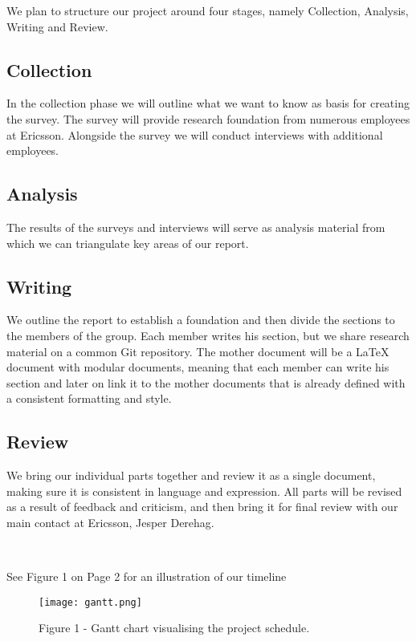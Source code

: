 \documentclass[ProjectPlan_innit.tex]{subfiles}
\begin{document}
We plan to structure our project around four stages, namely Collection, Analysis, Writing and Review. 

\subsection{Collection}
In the collection phase we will outline what we want to know as basis for creating the survey. The survey will provide research foundation from numerous employees at Ericsson. Alongside the survey we will conduct interviews with additional employees. 
\hspace{0pt}

\subsection{Analysis}
The results of the surveys and interviews will serve as analysis material from which we can triangulate key areas of our report.
\hspace{0pt}

\subsection{Writing}
We outline the report to establish a foundation and then divide the sections to the members of the group. Each member writes his section, but we share research material on a common Git repository. The mother document will be a LaTeX document with modular documents, meaning that each member can write his section and later on link it to the mother documents that is already defined with a consistent formatting and style.
\hspace{0pt}

\subsection{Review}
We bring our individual parts together and review it as a single document, making sure it is consistent in language and expression. All parts will be revised as a result of feedback and criticism, and then bring it for final review with our main contact at Ericsson, Jesper Derehag.  

\hspace{0pt} \

See Figure 1 on Page 2 for an illustration of our timeline

\begin{figure}[H]
	\texttt{[image: gantt.png]}
	\caption{Figure 1 - Gantt chart visualising the project schedule.}
	\label{AAA}
\end{figure}
\end{document}
